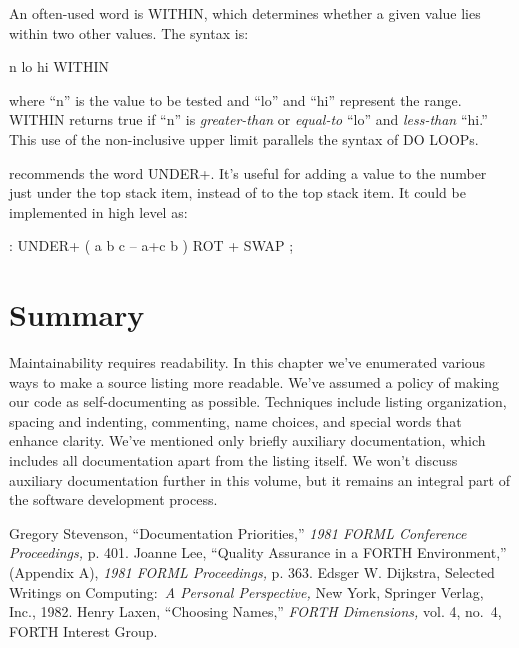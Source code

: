 An often-used word is WITHIN, which determines whether a given
value lies within two other values.  The syntax is:
\begin{Code}
n  lo hi WITHIN
\end{Code}
where ``n'' is the value to be tested and ``lo'' and ``hi'' represent the range.
WITHIN returns true if ``n'' is \emph{greater-than} or \emph{equal-to} ``lo'' and
\emph{less-than} ``hi.'' This use of the non-inclusive upper limit parallels the syntax
of DO LOOPs.

 recommends the word UNDER+.  It's useful for adding a
value to the number just under the top stack item, instead of to the top
stack item.  It could be implemented in high level as:
\begin{Code}
: UNDER+ ( a b c -- a+c b ) ROT + SWAP ;
\end{Code}

\section{Summary}
Maintainability requires readability.  In this chapter we've enumerated
various ways to make a source listing more readable.  We've assumed a
policy of making our code as self-documenting as possible.  Techniques include
listing organization, spacing and indenting, commenting, name
choices, and special words that enhance clarity.
We've mentioned only briefly auxiliary documentation, which includes
all documentation apart from the listing itself.  We won't discuss
auxiliary documentation further in this volume, but it remains an integral
part of the software development process.

\begin{references}{9}
 Gregory Stevenson, ``Documentation Priorities,''
\emph{1981 FORML Conference Proceedings,} p. 401.
 Joanne Lee, ``Quality Assurance in a FORTH
Environment,'' (Appendix A), \emph{1981 FORML Proceedings,} p. 363.
 Edsger W. Dijkstra, Selected Writings on
Computing:\ \emph{A Personal Perspective,} New York, Springer Verlag, Inc.,
1982.
 Henry Laxen, ``Choosing Names,'' \emph{FORTH Dimensions,}
vol. 4, no.\ 4, FORTH Interest Group.
\end{references}

